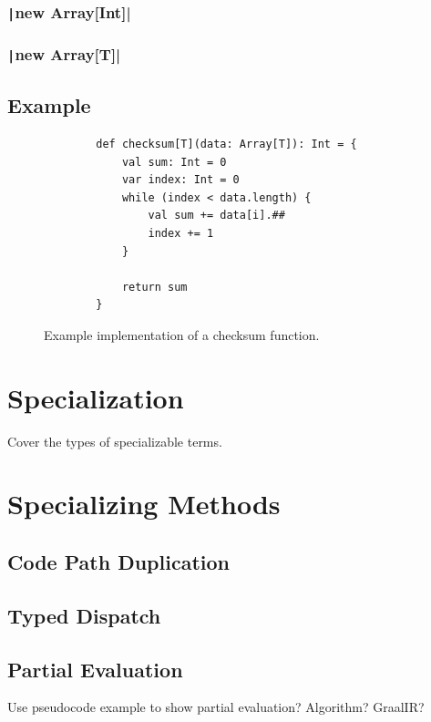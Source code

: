 \subsubsection{\texttt|new Array[Int]|}

\subsubsection{\texttt|new Array[T]|}

\subsection{Example}

\begin{figure}[H]
	\begin{verbatim}
		def checksum[T](data: Array[T]): Int = {
			val sum: Int = 0
			var index: Int = 0
			while (index < data.length) {
				val sum += data[i].##
				index += 1
			}
			
			return sum	
		}
	\end{verbatim}
	\caption{Example implementation of a checksum function.}
\end{figure}

\section{Specialization}

Cover the types of specializable terms.

\section{Specializing Methods}

\subsection{Code Path Duplication}

\subsection{Typed Dispatch}

\subsection{Partial Evaluation}

Use pseudocode example to show partial evaluation? Algorithm? GraalIR?

